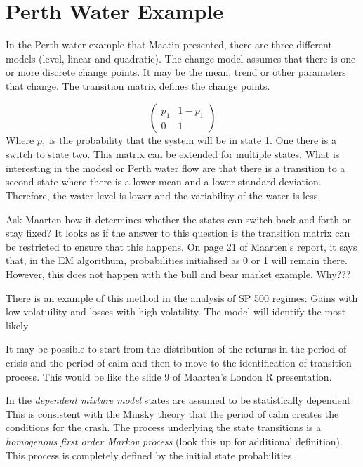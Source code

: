 \documentclass[12pt, a4paper, oneside]{article} %
\begin{document}
\section{Perth Water Example}

In the Perth water example that Maatin presented, there are three different models (level, linear and quadratic).  The change model assumes that there is one or more discrete change points.  It may be the mean, trend or other parameters that change. The transition matrix defines the change points.  

\begin{equation*}
\begin{pmatrix}
p_1 & 1 - p_1 \\
0 & 1
\end{pmatrix}
\end{equation*}
Where $p_1$ is the probability that the system will be in state 1.  One there is a switch to state two.  This matrix can be extended for multiple states. What is interesting in the modesl or Perth water flow are that there is a transition to a second state where there is a lower mean and a lower standard deviation. Therefore, the water level is lower and the variability of the water is less. 

Ask Maarten how it determines whether the states can switch back and forth or stay fixed?  It looks as if the answer to this question is the transition matrix can be restricted to ensure that this happens.  On page 21 of Maarten's report, it says that, in the EM algorithum, probabilities initialised as 0 or 1 will remain there.  However, this does not happen with the bull and bear market example.  Why???

There is an example of this method in the analysis of SP 500 regimes: Gains with low volatuility and losses with high volatility. The model will identify the most likely 

It may be possible to start from the distribution of the returns in the period of crisis and the period of calm and then to move to the identification of transition process.  This would be like the slide 9 of Maarten's London R presentation. 

In the \emph{dependent mixture model} states are assumed to be statistically dependent.  This is consistent with the Minsky theory that the period of calm creates the conditions for the crash. The process underlying the state transitions is a \emph{homogenous first order Markov process}  (look this up for additional definition).  This process is completely defined by the initial state probabilities.  
\end{document}
